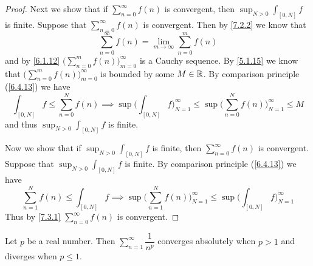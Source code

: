 \begin{proof}
  Next we show that if \(\sum_{n = 0}^\infty f(n)\) is convergent, then \(\sup_{N > 0} \int_{[0, N]} f\) is finite.
  Suppose that \(\sum_{n = 0}^\infty f(n)\) is convergent.
  Then by \cref{7.2.2} we know that
  \[
    \sum_{n = 0}^\infty f(n) = \lim_{m \to \infty} \sum_{n = 0}^m f(n)
  \]
  and by \cref{6.1.12} \(\big(\sum_{n = 0}^m f(n)\big)_{m = 0}^\infty\) is a Cauchy sequence.
  By \cref{5.1.15} we know that \(\big(\sum_{n = 0}^m f(n)\big)_{m = 0}^\infty\) is bounded by some \(M \in \mathbb{R}\).
  By comparison principle (\cref{6.4.13}) we have
  \[
    \int_{[0, N]} f \leq \sum_{n = 0}^N f(n) \implies \sup\bigg(\int_{[0, N]} f\bigg)_{N = 1}^\infty \leq \sup\bigg(\sum_{n = 0}^N f(n)\bigg)_{N = 1}^\infty \leq M
  \]
  and thus \(\sup_{N > 0} \int_{[0, N]} f\) is finite.

  Now we show that if \(\sup_{N > 0} \int_{[0, N]} f\) is finite, then \(\sum_{n = 0}^\infty f(n)\) is convergent.
  Suppose that \(\sup_{N > 0} \int_{[0, N]} f\) is finite.
  By comparison principle (\cref{6.4.13}) we have
  \[
    \sum_{n = 1}^N f(n) \leq \int_{[0, N]} f \implies \sup\bigg(\sum_{n = 1}^N f(n)\bigg)_{N = 1}^\infty \leq \sup\bigg(\int_{[0, N]} f\bigg)_{N = 1}^\infty
  \]
  Thus by \cref{7.3.1} \(\sum_{n = 0}^\infty f(n)\) is convergent.
\end{proof}

\begin{cor}\label{11.6.5}
  Let \(p\) be a real number.
  Then \(\sum_{n = 1}^\infty \dfrac{1}{n^p}\) converges absolutely when \(p > 1\) and diverges when \(p \leq 1\).
\end{cor}

